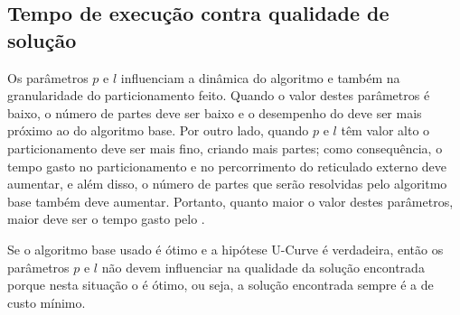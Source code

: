 \subsection{Tempo de execução contra qualidade de solução}
Os parâmetros $p$ e $l$ influenciam a dinâmica do algoritmo e também na
granularidade do particionamento feito. Quando o valor destes parâmetros
é baixo, o número de partes deve ser baixo e o desempenho do 
 deve ser mais próximo ao do algoritmo base.  Por outro 
lado, quando $p$ e $l$ têm valor alto o particionamento deve ser mais 
fino, criando mais partes; como consequência, o tempo gasto no 
particionamento e no percorrimento do reticulado externo deve aumentar, 
e além disso, o número de partes que serão resolvidas pelo algoritmo 
base também deve aumentar. Portanto, quanto maior o valor destes 
parâmetros, maior deve ser o tempo gasto pelo .

Se o algoritmo base usado é ótimo e a hipótese U-Curve é verdadeira, 
então os parâmetros $p$ e $l$ não devem influenciar na qualidade da 
solução encontrada porque nesta situação o  é ótimo, ou 
seja, a solução encontrada sempre é a de custo mínimo. 
